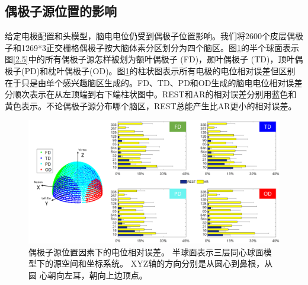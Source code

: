 \subsection{偶极子源位置的影响}
给定电极配置和头模型，脑电电位仍受到偶极子位置影响。我们将2600个皮层偶极子和1269*3正交栅格偶极子按大脑体素分区划分为四个脑区。图\ref{2.6}的半个球面表示图\ref{2.5}中的所有偶极子源怎样被划为额叶偶极子 (FD)，颞叶偶极子 (TD)，顶叶偶极子(PD)和枕叶偶极子(OD)。图\ref{2.6}的柱状图表示所有电极的电位相对误差但区别在于只是由单个感兴趣脑区生成的。FD、TD、PD和OD生成的脑电电位相对误差分顺次表示在从左顶端到右下端柱状图中。REST和AR的相对误差分别用蓝色和黄色表示。不论偶极子源分布哪个脑区，REST总能产生比AR更小的相对误差。
\begin{figure}[h!]
	\centering
	\includegraphics[width=15cm]{pic/JNE/figure6.png}
	\caption{偶极子源位置因素下的电位相对误差。 半球面表示三层同心球面模型下的源空间和坐标系统。 XYZ轴的方向分别是从圆心到鼻根，从圆
	心朝向左耳，朝向上边顶点。}
	\label{2.6}
\end{figure}


